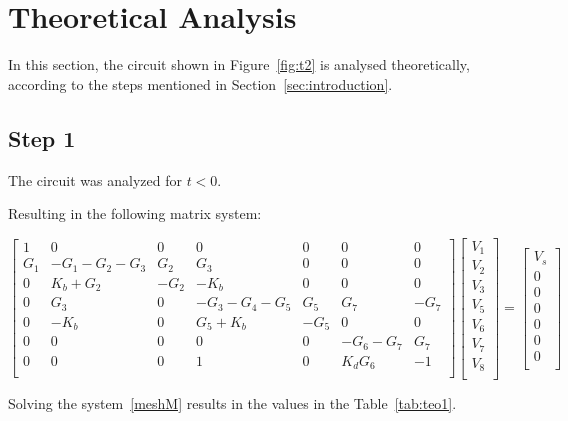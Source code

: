 \section{Theoretical Analysis}
\label{sec:analysis}

In this section, the circuit shown in Figure~\ref{fig:t2} is analysed
theoretically, according to the steps mentioned in Section~\ref{sec:introduction}.

\subsection{Step 1}
The circuit was analyzed for $t<0$.

Resulting in the following matrix system:


\begin{equation}\label{meshM}
  \begin{bmatrix}
    1 & 0 & 0 & 0 & 0 & 0 & 0 \\
    G_1 & -G_1-G_2-G_3 & G_2 & G_3 & 0 & 0 & 0 \\
    0 & K_b+G_2 & -G_2 & -K_b & 0 & 0 & 0 \\
    0 & G_3 & 0 & -G_3-G_4-G_5 & G_5 & G_7 & -G_7 \\
    0 & -K_b & 0 & G_5+K_b & -G_5 & 0 & 0 \\
    0 & 0 & 0 & 0 & 0 & -G_6-G_7 & G_7 \\
    0 & 0 & 0 & 1 & 0 & K_dG_6 & -1 \\
  \end{bmatrix}
  \begin{bmatrix}
    V_1\\
    V_2\\
    V_3\\
    V_5\\
    V_6\\
    V_7\\
    V_8\\
  \end{bmatrix}
  =
  \begin{bmatrix}
    V_s\\
    0\\
    0\\
    0\\
    0\\
    0\\
    0\\
  \end{bmatrix}
\end{equation}

Solving the system~\ref{meshM} results in the values in the Table~\ref{tab:teo1}.

